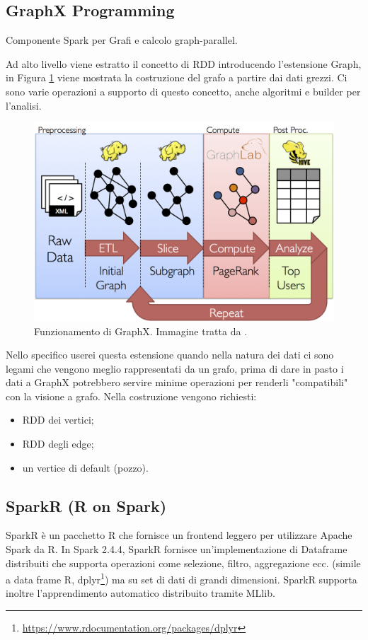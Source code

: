 \documentclass[12pt,italian]{article}
\begin{document}
\subsection{GraphX Programming}
Componente Spark per Grafi e calcolo graph-parallel.

Ad alto livello viene estratto il concetto di RDD introducendo l'estensione Graph, in Figura \ref{fig:GraphX} viene mostrata la costruzione del grafo a partire dai dati grezzi.
Ci sono varie operazioni a supporto di questo concetto, anche algoritmi e builder per l'analisi.
\begin{figure}[H]
	\centering 
	\includegraphics[width=0.8\linewidth]{img/graph_analytics_pipeline.png}
	\caption{Funzionamento di GraphX. Immagine tratta da \cite{spark}.}
	\label{fig:GraphX}
\end{figure}
Nello specifico userei questa estensione quando nella natura dei dati ci sono legami che vengono meglio rappresentati da un grafo,
prima di dare in pasto i dati a GraphX potrebbero servire minime operazioni per renderli "compatibili" con la visione a grafo.
Nella costruzione vengono richiesti:
\begin{itemize}
	\item RDD dei vertici;
	\item RDD degli edge;
	\item un vertice di default (pozzo).
\end{itemize}
\subsection{SparkR (R on Spark)}
SparkR è un pacchetto R che fornisce un frontend leggero per utilizzare Apache Spark da R. In Spark 2.4.4, SparkR fornisce un'implementazione di Dataframe distribuiti che supporta operazioni come selezione, filtro, aggregazione ecc. (simile a data frame R, dplyr\footnote{\url{https://www.rdocumentation.org/packages/dplyr}}) ma su set di dati di grandi dimensioni. SparkR supporta inoltre l'apprendimento automatico distribuito tramite MLlib.
\end{document}
